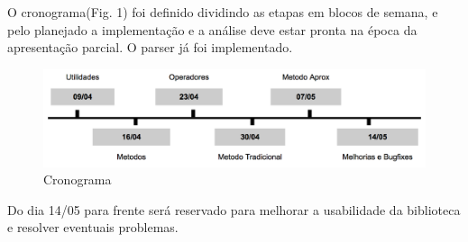 %

O cronograma(Fig. 1) foi definido dividindo as etapas em blocos de semana, e pelo planejado a implementação e a análise deve estar pronta na época da apresentação parcial. O parser já foi implementado.

\begin{figure}[h]
\centering
\includegraphics[width=\textwidth]{roadmap.png}
\caption{Cronograma}
\end{figure}

Do dia 14/05 para frente será reservado para melhorar a usabilidade da biblioteca e resolver eventuais problemas.
